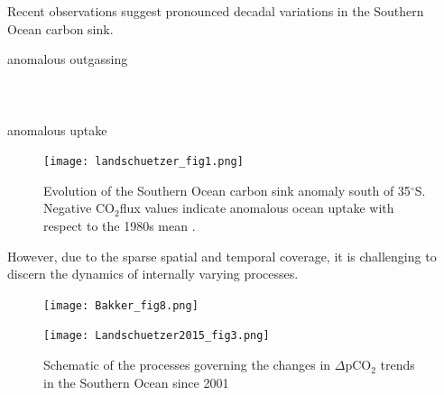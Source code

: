 \documentclass[aspectratio=169]{beamer}
\begin{document}
\begin{frame}{Recent observations suggest pronounced decadal variations in the Southern Ocean carbon sink.}
\begin{minipage}{.11\textwidth}
\small \vspace{-1.5cm} anomalous outgassing \\ \\ \\ \\{anomalous uptake}
\end{minipage} \hfill 
	\begin{minipage}{.88\textwidth}
\begin{figure}[h]
	\centering
	\texttt{[image: landschuetzer\_fig1.png]} %
\vspace{-1.5mm}	
	\caption{Evolution of the Southern Ocean carbon sink anomaly south of 35$^\circ$S. Negative CO$_2$flux values indicate anomalous ocean uptake with respect to the 1980s mean \citep{landschuetzer2015}.}
	\label{fig:landschuetzer_fig1}
\end{figure}
\end{minipage}
\end{frame}





\begin{frame}{However, due to the sparse spatial and temporal coverage, it is challenging to discern the dynamics of internally varying processes.}
\begin{figure}[h]
	\centering
	\begin{minipage}{.45\textwidth}
		\centering
		\texttt{[image: Bakker\_fig8.png]}
		\caption{The number of (a) months of the year and (b) total months with surface water pCO$_2$ from 1970 to 2011 in SOCATv2 \citep{Bakker2014}}
		\label{fig:Bakker_fig1}
	\end{minipage} \hfill \pause
	\begin{minipage}{.45\textwidth}
		\centering
		\texttt{[image: Landschuetzer2015\_fig3.png]} %
		\caption{Schematic of the processes governing the changes in $\Delta$pCO$_2$ trends in the Southern Ocean since 2001 \citep{landschuetzer2015}}
		\label{fig:landschuetzer_fig3}
	\end{minipage}
\end{figure}

\end{frame}
\end{document}

